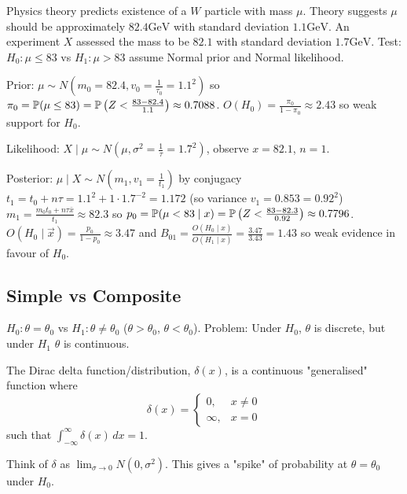 \documentclass[10pt, a4paper]{article}
\begin{document}
\begin{example}
    Physics theory predicts existence of a $W$ particle with mass $\mu$.
    Theory suggests $\mu$ should be approximately $82.4\mathrm{GeV}$ with standard deviation $1.1\mathrm{GeV}$.
    An experiment $X$ assessed the mass to be $82.1$ with standard deviation $1.7\mathrm{GeV}$.
    Test:
    $H_0 : \mu \leq 83$ vs $H_1 : \mu > 83$ assume Normal prior and Normal likelihood.

    Prior:
    $\mu \sim N\left(m_0  = 82.4, v_0 = \frac{1}{\tau_0} = 1.1 ^ 2\right)$ so $\pi_0 = \P(\mu \leq 83) = \P\left(Z < \frac{83 - 82.4}{1.1}\right) \approx 0.7088$.
    $O(H_0) = \frac{\pi_0}{1 - \pi_0} \approx 2.43$ so weak support for $H_0$.

    Likelihood:
    $X \mid \mu \sim N\left(\mu, \sigma ^ 2 = \frac{1}{\tau} = 1.7 ^ 2\right)$,
    observe $x = 82.1$,
    $n = 1$.

    Posterior:
    $\mu \mid X \sim N\left(m_1, v_1 = \frac{1}{t_1}\right)$ by conjugacy
    $t_1 = t_0 + n\tau = 1.1 ^ 2 + 1 \cdot 1.7 ^ {-2} = 1.172$
    (so variance $v_1 = 0.853 = 0.92 ^ 2$)
    $m_1 = \frac{m_0t_0 + n\tau\bar{x}}{t_1} \approx 82.3$ so $p_0 = \P(\mu < 83 \mid x) = \P\left(Z < \frac{83 - 82.3}{0.92}\right) \approx 0.7796$.
    $O(H_0 \mid \vec{x}) = \frac{p_0}{1 - p_0} \approx 3.47$ and $B_{01} = \frac{O(H_0 \mid x)}{O(H_1 \mid x)} = \frac{3.47}{3.43} = 1.43$ so weak evidence in favour of $H_0$.
\end{example}

\subsection{Simple vs Composite}
$H_0 : \theta = \theta_0$ vs $H_1 : \theta \neq \theta_0$
($\theta > \theta_0$,
$\theta < \theta_0$).
Problem:
Under $H_0$,
$\theta$ is discrete,
but under $H_1$ $\theta$ is continuous.

\begin{definition}
    The Dirac delta function/distribution,
    $\delta(x)$,
    is a continuous
    "generalised"
    function where
    \[
    \delta(x) = \begin{cases}
        0, &x \neq 0 \\
        \infty, &x = 0
    \end{cases}
    \]
    such that $\int_{-\infty}^{\infty}\delta(x)\,dx = 1$.
\end{definition}
Think of $\delta$ as $\lim_{\sigma \to 0}N(0, \sigma ^ 2)$.
This gives a
"spike"
of probability at $\theta = \theta_0$ under $H_0$.
\end{document}
